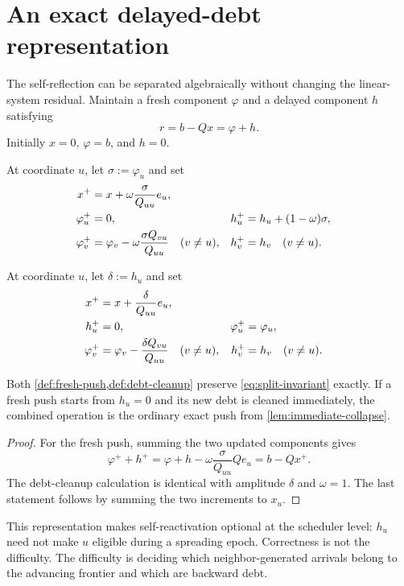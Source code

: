 \section{An exact delayed-debt representation}
\label{sec:debt}

The self-reflection can be separated algebraically without changing the
linear-system residual.  Maintain a fresh component $\varphi$ and a delayed
component $h$ satisfying
\begin{equation}
 r=b-Qx=\varphi+h.
 \label{eq:split-invariant}
\end{equation}
Initially $x=0$, $\varphi=b$, and $h=0$.

\begin{definition}
\label{def:fresh-push}
At coordinate $u$, let $\sigma:=\varphi_u$ and set
\begin{align}
 x^+&=x+\omega\frac{\sigma}{Q_{uu}}e_u,\notag\\
 \varphi_u^+&=0,
 &h_u^+&=h_u+(1-\omega)\sigma,\notag\\
 \varphi_v^+&=\varphi_v-\omega\frac{\sigma Q_{vu}}{Q_{uu}}
 \quad(v\neq u),
 &h_v^+&=h_v\quad(v\neq u).
 \label{eq:fresh-push}
\end{align}
\end{definition}

\begin{definition}
\label{def:debt-cleanup}
At coordinate $u$, let $\delta:=h_u$ and set
\begin{align}
 x^+&=x+\frac{\delta}{Q_{uu}}e_u,\notag\\
 h_u^+&=0,
 &\varphi_u^+&=\varphi_u,\notag\\
 \varphi_v^+&=\varphi_v-\frac{\delta Q_{vu}}{Q_{uu}}
 \quad(v\neq u),
 &h_v^+&=h_v\quad(v\neq u).
 \label{eq:debt-cleanup}
\end{align}
\end{definition}

\begin{lemma}
\label{lem:split-correctness}
Both \cref{def:fresh-push,def:debt-cleanup} preserve
\cref{eq:split-invariant} exactly.  If a fresh push starts from $h_u=0$ and
its new debt is cleaned immediately, the combined operation is the ordinary
exact push from \cref{lem:immediate-collapse}.
\end{lemma}

\begin{proof}
For the fresh push, summing the two updated components gives
\[
 \varphi^++h^+
 =\varphi+h-\omega\frac{\sigma}{Q_{uu}}Qe_u
 =b-Qx^+.
\]
The debt-cleanup calculation is identical with amplitude $\delta$ and
$\omega=1$.  The last statement follows by summing the two increments to
$x_u$.
\end{proof}

This representation makes self-reactivation optional at the scheduler level:
$h_u$ need not make $u$ eligible during a spreading epoch.  Correctness is
not the difficulty.  The difficulty is deciding which neighbor-generated
arrivals belong to the advancing frontier and which are backward debt.
